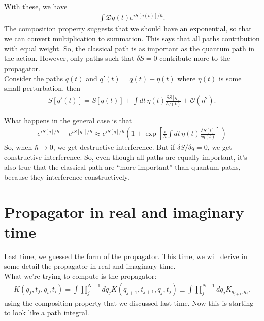 \documentclass{book}
\theoremstyle{definition}
\newcommand{\f}[2]{\frac{#1}{#2}}
\newcommand{\lp}{\left(}
\newcommand{\rp}{\right)}
\newcommand{\lb}{\left[}
\newcommand{\rb}{\right]}
\begin{document}
With these, we have 
\begin{align}
\int \mathfrak{D}q(t) e^{iS[q(t)]/\hbar}.
\end{align}
The composition property suggests that we should have an exponential, so that we can convert multiplication to summation. This says that all paths contribution with equal weight. So, the classical path is as important as the quantum path in the action. However, only paths such that $\delta S = 0$ contribute more to the propagator. \\

Consider the paths $q(t)$ and $q'(t) = q(t) + \eta (t)$ where $\eta(t)$ is some small perturbation, then 
\begin{align}
S[q'(t)] = S[q(t)] + \int dt\, \eta(t) \f{\delta S[q]}{\delta q(t)} + \mathcal{O}(\eta^2).
\end{align}

What happens in the general case is that 
\begin{align}
e^{iS[q]/\hbar} + e^{iS[q']/\hbar} \approx  e^{iS[q]/\hbar}\lp 1 + \exp\lb \f{i}{\hbar} \int dt\, \eta(t) \f{\delta S[t]}{\delta q(t)} \rb \rp
\end{align}
So, when $\hbar \to 0$, we get destructive interference. But if $\delta S/\delta q = 0$, we get constructive interference. So, even though all paths are equally important, it's also true that the classical path are ``more important'' than quantum paths, because they interference constructively. 








\newpage
\section{Propagator in real and imaginary time}


Last time, we guessed the form of the propagator. This time, we will derive in some detail the propagator in real and imaginary time. \\


What we're trying to compute is the propagator:
\begin{align}
K(q_f, t_f,q_i ,t_i) =  \int \prod_j^{N-1}   dq_j K (q_{j+1},t_{j+1}, q_j , t_j) \equiv  \int \prod_j^{N-1}   dq_j K_{q_{j+1},q_j}.
\end{align}
using the composition property that we discussed last time. Now this is starting to look like a path integral. \\
\end{document}
